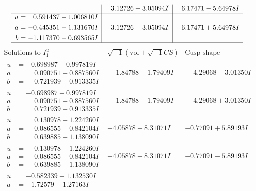 \documentclass[1p]{elsarticle_modified}
\theoremstyle{definition}
\newcommand{\I}{\sqrt{-1}}
\begin{document}
$$\begin{array}{c|c|c}
 & \phantom{-}3.12726 + 3.05094 I & \phantom{-}6.17471 - 5.64978 I \\ \hline\begin{aligned}
u &= \phantom{-}0.591437 - 1.006810 I \\
a &= -0.445351 - 1.131670 I \\
b &= -1.117370 - 0.693565 I\end{aligned}
 & \phantom{-}3.12726 - 3.05094 I & \phantom{-}6.17471 + 5.64978 I\\
 \hline 
 \end{array}$$\newpage$$\begin{array}{c|c|c}  
\text{Solutions to }I^u_{1}& \I (\text{vol} + \sqrt{-1}CS) & \text{Cusp shape}\\
 \hline 
\begin{aligned}
u &= -0.698987 + 0.997819 I \\
a &= \phantom{-}0.090751 + 0.887560 I \\
b &= \phantom{-}0.721939 + 0.913335 I\end{aligned}
 & \phantom{-}1.84788 + 1.79409 I & \phantom{-}4.29068 - 3.01350 I \\ \hline\begin{aligned}
u &= -0.698987 - 0.997819 I \\
a &= \phantom{-}0.090751 - 0.887560 I \\
b &= \phantom{-}0.721939 - 0.913335 I\end{aligned}
 & \phantom{-}1.84788 - 1.79409 I & \phantom{-}4.29068 + 3.01350 I \\ \hline\begin{aligned}
u &= \phantom{-}0.130978 + 1.224260 I \\
a &= \phantom{-}0.086555 + 0.842104 I \\
b &= \phantom{-}0.639885 - 1.138090 I\end{aligned}
 & -4.05878 - 8.31071 I & -0.77091 + 5.89193 I \\ \hline\begin{aligned}
u &= \phantom{-}0.130978 - 1.224260 I \\
a &= \phantom{-}0.086555 - 0.842104 I \\
b &= \phantom{-}0.639885 + 1.138090 I\end{aligned}
 & -4.05878 + 8.31071 I & -0.77091 - 5.89193 I \\ \hline\begin{aligned}
u &= -0.582339 + 1.132530 I \\
a &= -1.72579 - 1.27163 I \\

\end{aligned}
\end{array}$$
\end{document}
